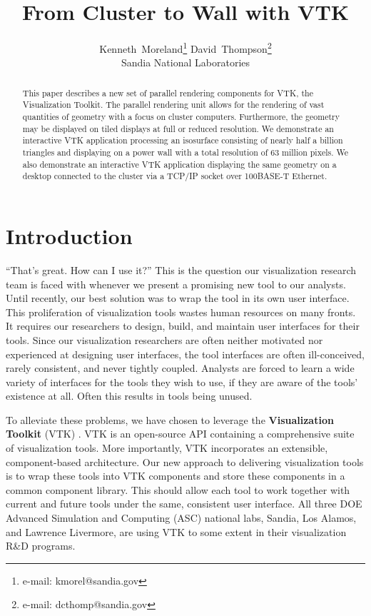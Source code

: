 \documentclass{acmsiggraph}
\title{From Cluster to Wall with VTK}
\author{Kenneth~Moreland\thanks{e-mail: kmorel@sandia.gov} \hspace{.2in}
  David~Thompson\thanks{e-mail: dcthomp@sandia.gov}
  \\ Sandia National Laboratories}
\newcommand{\keyterm}[1]{\textbf{#1}}
\begin{document}
  \maketitle

  \begin{abstract}
    This paper describes a new set of parallel rendering components for
    VTK, the Visualization Toolkit.  The parallel rendering unit allows for
    the rendering of vast quantities of geometry with a focus on cluster
    computers.  Furthermore, the geometry may be displayed on tiled
    displays at full or reduced resolution.  We demonstrate an interactive
    VTK application processing an isosurface consisting of nearly half a
    billion triangles and displaying on a power wall with a total
    resolution of 63 million pixels.  We also demonstrate an interactive
    VTK application displaying the same geometry on a desktop connected to
    the cluster via a TCP/IP socket over 100BASE-T Ethernet.
  \end{abstract}

  \begin{CRcatlist}
  \end{CRcatlist}

  \keywordlist

  \copyrightspace

  \section{Introduction}
  \label{sec:introduction}

  ``That's great.  How can I use it?''  This is the question our
  visualization research team is faced with whenever we present a promising
  new tool to our analysts.  Until recently, our best solution was to wrap
  the tool in its own user interface.  This proliferation of visualization
  tools wastes human resources on many fronts.  It requires our researchers
  to design, build, and maintain user interfaces for their tools.  Since
  our visualization researchers are often neither motivated nor experienced
  at designing user interfaces, the tool interfaces are often
  ill-conceived, rarely consistent, and never tightly coupled.  Analysts
  are forced to learn a wide variety of interfaces for the tools they wish
  to use, if they are aware of the tools' existence at all.  Often this
  results in tools being unused.

  To alleviate these problems, we have chosen to leverage the
  \keyterm{Visualization Toolkit} (VTK) \cite{Schroeder02}.  VTK is an
  open-source API containing a comprehensive suite of visualization tools.
  More importantly, VTK incorporates an extensible, component-based
  architecture.  Our new approach to delivering visualization tools is to
  wrap these tools into VTK components and store these components in a
  common component library.  This should allow each tool to work together
  with current and future tools under the same, consistent user interface.
  All three DOE Advanced Simulation and Computing (ASC) national labs,
  Sandia, Los Alamos, and Lawrence Livermore, are using VTK to some extent
  in their visualization R\&D programs.
\end{document}
